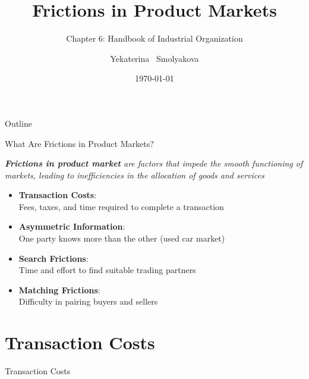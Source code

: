 \documentclass[aspectratio=169]{beamer}  %
\title[Frictions in Product Markets] 
{Frictions in Product Markets}
\subtitle
{Chapter 6: Handbook of Industrial Organization}
\author[Yekaterina Smolyakova]{Yekaterina ~Smolyakova}
\institute{Hong Kong University of Science and Technology}
\date[Short Occasion] 
{\today}
\begin{document}
\begin{frame}
\titlepage
\end{frame}

\begin{frame}{Outline}{}
 \begin{spacing}{1.5}
    {\footnotesize
  \tableofcontents} 
 \end{spacing}
\end{frame}

\begin{frame}{What Are Frictions in Product Markets?}
\begin{spacing}{1.5}
{\small 
\textit{\textbf{Frictions in product market} are factors that impede the smooth functioning of markets, leading to inefficiencies in the allocation of goods and services\\}}

{\footnotesize
    \begin{itemize}
        \item \quad \textbf{Transaction Costs}: \\
        \quad Fees, taxes, and time required to complete a transaction
        \item \quad \textbf{Asymmetric Information}:\\
         \quad One party knows more than the other (used car market)
        \item \quad \textbf{Search Frictions}:\\
        \quad Time and effort to find suitable trading partners
        \item \quad \textbf{Matching Frictions}: \\
        \quad Difficulty in pairing buyers and sellers

    \end{itemize}}
\end{spacing}
\end{frame}


\section{Transaction Costs}
\begin{frame}{ }
\centering
{\Large Transaction Costs}
\end{frame}
\end{document}
